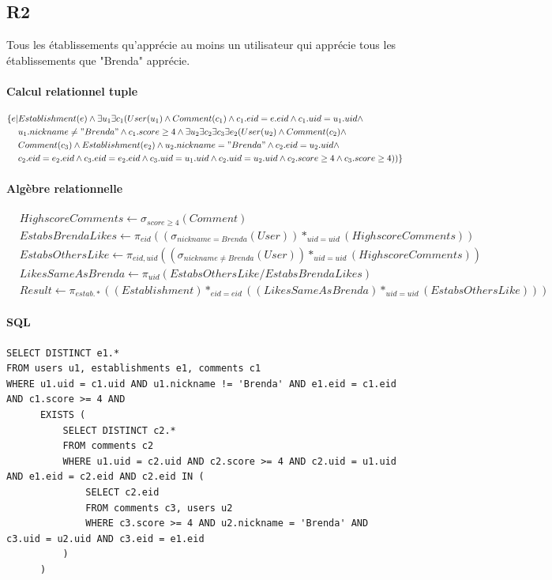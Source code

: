 \documentclass[11pt,a4paper]{report}
\begin{document}
\subsection*{R2}

\noindent Tous les établissements qu’apprécie au moins un utilisateur qui apprécie tous les établissements que "Brenda" apprécie.
\paragraph*{Calcul relationnel tuple}
\begin{align*}
\{e|& Establishment(e) \wedge \exists u_{1} \exists c_{1} (User(u_{1}) \wedge Comment(c_{1}) \wedge c_{1}.eid = e.eid \wedge c_{1}.uid=u_{1}.uid \wedge \\
& u_{1}.nickname \neq "Brenda" \wedge c_{1}.score \geq 4 \wedge  \exists u_{2} \exists c_{2} \exists c_{3} \exists e_{2} ( User(u_{2}) \wedge Comment(c_{2})\wedge \\
& Comment(c_{3}) \wedge Establishment(e_{2}) \wedge u_{2}.nickname = "Brenda" \wedge c_{2}.eid = u_{2}.uid \wedge \\
& c_{2}.eid = e_{2}.eid \wedge  c_{3}.eid = e_{2}.eid \wedge  c_{3}.uid = u_{1}.uid \wedge  c_{2}.uid = u_{2}.uid \wedge c_{2}.score \geq 4 \wedge c_{3}.score \geq 4
))
\}
\end{align*}
\paragraph*{Algèbre relationnelle}
\begin{align*}
& HighscoreComments \leftarrow \sigma_{score \ge 4} (Comment) \\
& EstabsBrendaLikes \leftarrow \pi_{eid} ( (\sigma_{nickname=Brenda} (User)) *_{uid=uid} (HighscoreComments) ) \\
& EstabsOthersLike \leftarrow \pi_{eid, uid} ( (\sigma_{nickname \neq Brenda} (User)) *_{uid=uid} (HighscoreComments) ) \\
& LikesSameAsBrenda \leftarrow \pi_{uid} (EstabsOthersLike / EstabsBrendaLikes) \\
& Result \leftarrow \pi_{estab.*} ((Establishment) *_{eid=eid} ((LikesSameAsBrenda) *_{uid=uid} (EstabsOthersLike)))
\end{align*}
\paragraph*{SQL}
\begin{verbatim}
SELECT DISTINCT e1.*
FROM users u1, establishments e1, comments c1
WHERE u1.uid = c1.uid AND u1.nickname != 'Brenda' AND e1.eid = c1.eid AND c1.score >= 4 AND 
      EXISTS (
          SELECT DISTINCT c2.*
          FROM comments c2 
          WHERE u1.uid = c2.uid AND c2.score >= 4 AND c2.uid = u1.uid AND e1.eid = c2.eid AND c2.eid IN (
              SELECT c2.eid
              FROM comments c3, users u2
              WHERE c3.score >= 4 AND u2.nickname = 'Brenda' AND c3.uid = u2.uid AND c3.eid = e1.eid
          )
      )
\end{verbatim}
\end{document}
